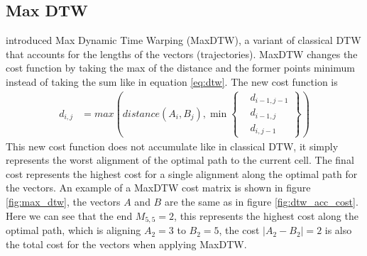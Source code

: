 \subsection{Max DTW}
\textcite{zhao2018rest} introduced Max Dynamic Time Warping (MaxDTW), a variant of classical DTW that accounts for the lengths of the vectors (trajectories). MaxDTW changes the cost function by taking the max of the distance and the former points minimum instead of taking the sum like in equation \ref{eq:dtw}. The new cost function is
\begin{equation}
    \label{eq:max_dtw}
    \begin{aligned}
        d_{i, j} & = max(distance(A_{i}, B_{j}), \min \left\{ \begin{aligned}
                                                                   & d_{i-1, j-1} \\
                                                                   & d_{i-1, j}   \\
                                                                   & d_{i, j-1}
                                                              \end{aligned} \right\})
    \end{aligned}
\end{equation}
This new cost function does not accumulate like in classical DTW, it simply represents the worst alignment of the optimal path to the current cell. The final cost represents the highest cost for a single alignment along the optimal path for the vectors. An example of a MaxDTW cost matrix is shown in figure \ref{fig:max_dtw}, the vectors $A$ and $B$ are the same as in figure \ref{fig:dtw_acc_cost}. Here we can see that the end $M_{5,5} = 2$, this represents the highest cost along the optimal path, which is aligning $A_2 = 3$ to $B_2 = 5$, the cost $|A_2 - B_2| = 2$ is also the total cost for the vectors when applying MaxDTW.
